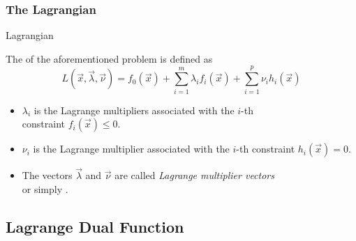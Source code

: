 \begin{frame}
  \frametitle{The Lagrangian}
 
  \begin{citeblock}{Lagrangian}

    The  of the aforementioned problem is defined as
    \begin{displaymath}
      L(\vec{x},\vec{\lambda}, \vec{\nu}) = 
      f_0(\vec{x}) + \sum_{i=1}^m \lambda_i f_i(\vec{x}) + \sum_{i=1}^p \nu_i h_i(\vec{x})
    \end{displaymath}
    \pause
 
    \begin{itemize}
      \item $\lambda_i$ is the Lagrange multipliers associated with the $i$-th  \\
        constraint $f_i(\vec{x})\leq 0$. \\[.15cm] \pause
      \item $\nu_i$ is the Lagrange multiplier associated with the $i$-th  constraint $h_i(\vec{x})= 0$. \\[.15cm] \pause
      \item The vectors $\vec{\lambda}$ and $\vec{\nu}$ are called {\em Lagrange multiplier vectors} \\
        or simply . 
    \end{itemize}
  \end{citeblock}
\end{frame}


\subsection{Lagrange Dual Function}

